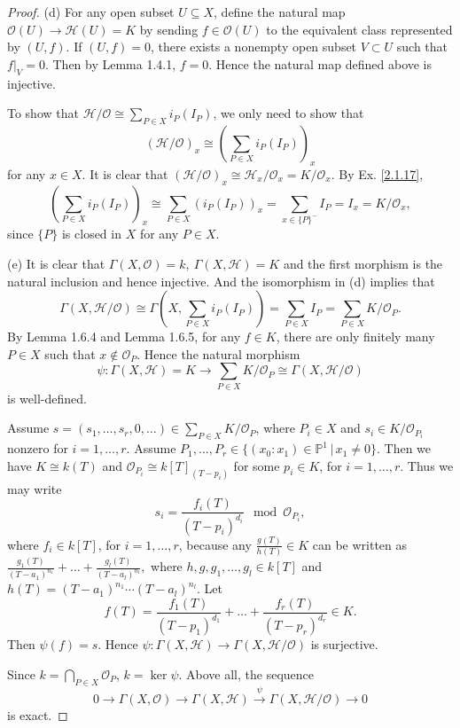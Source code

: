 \documentclass[12pt]{amsart}
\begin{document}
\begin{proof}
	(d) For any open subset $U\subseteq X$, define the natural map $\mathcal{O}(U)\to\mathscr{H}(U)=K$ by sending $f\in\mathcal{O}(U)$ to the equivalent class represented by $(U,f)$. If $(U,f)=0$, there exists a nonempty open subset $V\subset U$ such that $f|_V=0$. Then by Lemma 1.4.1, $f=0$. Hence the natural map defined above is injective.
	
	To show that $\mathscr{H}/\mathcal{O}\cong\sum_{P\in X}i_P(I_P)$, we only need to show that $$(\mathscr{H}/\mathcal{O})_x\cong\left(\sum_{P\in X}i_P(I_P)\right)_x$$ for any $x\in X$. It is clear that $(\mathscr{H}/\mathcal{O})_x\cong\mathscr{H}_x/\mathcal{O}_x=K/\mathcal{O}_x$. By Ex. \ref{2.1.17}, $$\left(\sum_{P\in X}i_P(I_P)\right)_x\cong\sum_{P\in X}(i_P(I_P))_x=\sum_{x\in\{P\}^-}I_P=I_x=K/\mathcal{O}_x,$$ since $\{P\}$ is closed in $X$ for any $P\in X$.
	
	(e) It is clear that $\Gamma(X,\mathcal{O})=k,\ \Gamma(X,\mathscr{H})=K$ and the first morphism is the natural inclusion and hence injective. And the isomorphism in (d) implies that $$\Gamma(X,\mathscr{H}/\mathcal{O})\cong\Gamma\left(X,\sum_{P\in X}i_P(I_P)\right)=\sum_{P\in X}I_P=\sum_{P\in X}K/\mathcal{O}_P.$$ By Lemma 1.6.4 and Lemma 1.6.5, for any $f\in K$, there are only finitely many $P\in X$ such that $x\notin\mathcal{O}_P$. Hence the natural morphism $$\psi:\Gamma(X,\mathscr{H})=K\to\sum_{P\in X}K/\mathcal{O}_P\cong\Gamma(X,\mathscr{H}/\mathcal{O})$$ is well-defined.
	
	Assume $s=(s_1,\dots,s_r,0,\dots)\in\sum_{P\in X}K/\mathcal{O}_P$, where $P_i\in X$ and $s_i\in K/\mathcal{O}_{P_i}$ nonzero for $i=1,\dots,r$. Assume $P_1,\dots,P_r\in\{(x_0:x_1)\in\mathbb{P}^1\,|\,x_1\neq0\}$. Then we have $K\cong k(T)$ and $\mathcal{O}_{P_i}\cong k[T]_{(T-p_i)}$ for some $p_i\in K$, for $i=1,\dots,r$. Thus we may write $$s_i=\frac{f_i(T)}{(T-p_i)^{d_i}}\mod\mathcal{O}_{P_i},$$ where $f_i\in k[T]$, for $i=1,\dots,r$, because any $\frac{g(T)}{h(T)}\in K$ can be written as $\frac{g_1(T)}{(T-a_1)^{n_1}}+\dots+\frac{g_l(T)}{(T-a_l)^{n_l}},$ where $h,g,g_1,\dots,g_l\in k[T]$ and $h(T)=(T-a_1)^{n_1}\cdots(T-a_l)^{n_l}$. Let $$f(T)=\frac{f_1(T)}{(T-p_1)^{d_1}}+\dots+\frac{f_r(T)}{(T-p_r)^{d_r}}\in K.$$ Then $\psi(f)=s$. Hence $\psi:\Gamma(X,\mathscr{H})\to\Gamma(X,\mathscr{H}/\mathcal{O})$ is surjective.
	
	Since $k=\bigcap_{P\in X}\mathcal{O}_P$, $k=\ker\psi$. Above all, the sequence$$0\to\Gamma(X,\mathcal{O})\to\Gamma(X,\mathscr{H})\xrightarrow{\psi}\Gamma(X,\mathscr{H}/\mathcal{O})\to0$$is exact.
\end{proof}
\end{document}
